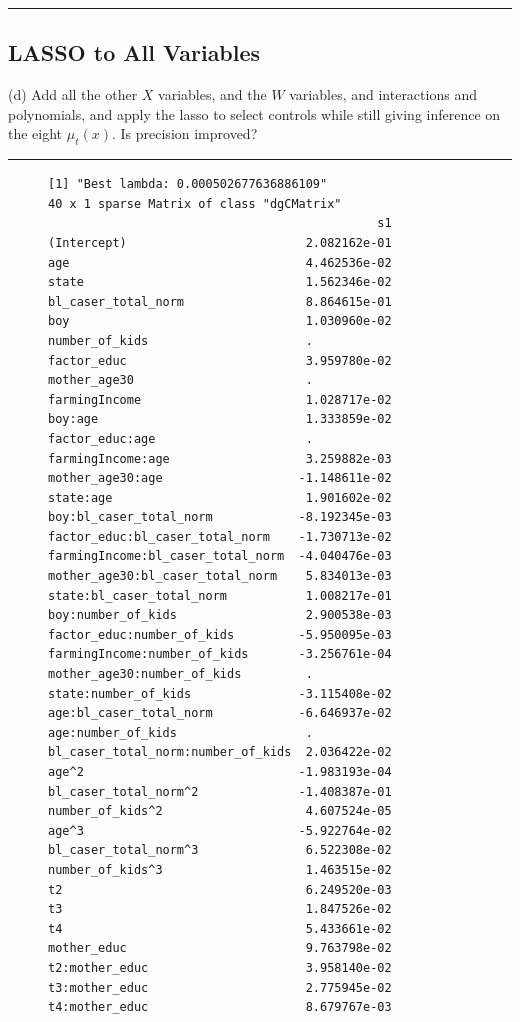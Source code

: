 \documentclass{article}
\newenvironment{colorparagraph}[1]{\par\color{#1}}{\par}
\begin{document}
\begin{colorparagraph}{questioncolor}
\label{q3d}
\rule{\textwidth}{0.5pt}
\subsection{LASSO to All Variables}
(d) Add all the other \( X \) variables, and the \( W \) variables, and interactions and polynomials, and apply the lasso to select controls while still giving inference on the eight \( \mu_t(x) \). Is precision improved?

\rule{\textwidth}{0.5pt}
\end{colorparagraph}

\begin{figure}[H]
\begin{lstlisting}[style=RstyleComment, caption=LASSO for CATE]
[1] "Best lambda: 0.000502677636886109"
40 x 1 sparse Matrix of class "dgCMatrix"
                                              s1
(Intercept)                         2.082162e-01
age                                 4.462536e-02
state                               1.562346e-02
bl_caser_total_norm                 8.864615e-01
boy                                 1.030960e-02
number_of_kids                      .           
factor_educ                         3.959780e-02
mother_age30                        .           
farmingIncome                       1.028717e-02
boy:age                             1.333859e-02
factor_educ:age                     .           
farmingIncome:age                   3.259882e-03
mother_age30:age                   -1.148611e-02
state:age                           1.901602e-02
boy:bl_caser_total_norm            -8.192345e-03
factor_educ:bl_caser_total_norm    -1.730713e-02
farmingIncome:bl_caser_total_norm  -4.040476e-03
mother_age30:bl_caser_total_norm    5.834013e-03
state:bl_caser_total_norm           1.008217e-01
boy:number_of_kids                  2.900538e-03
factor_educ:number_of_kids         -5.950095e-03
farmingIncome:number_of_kids       -3.256761e-04
mother_age30:number_of_kids         .           
state:number_of_kids               -3.115408e-02
age:bl_caser_total_norm            -6.646937e-02
age:number_of_kids                  .           
bl_caser_total_norm:number_of_kids  2.036422e-02
age^2                              -1.983193e-04
bl_caser_total_norm^2              -1.408387e-01
number_of_kids^2                    4.607524e-05
age^3                              -5.922764e-02
bl_caser_total_norm^3               6.522308e-02
number_of_kids^3                    1.463515e-02
t2                                  6.249520e-03
t3                                  1.847526e-02
t4                                  5.433661e-02
mother_educ                         9.763798e-02
t2:mother_educ                      3.958140e-02
t3:mother_educ                      2.775945e-02
t4:mother_educ                      8.679767e-03
\end{lstlisting}
\end{figure}
\end{document}
